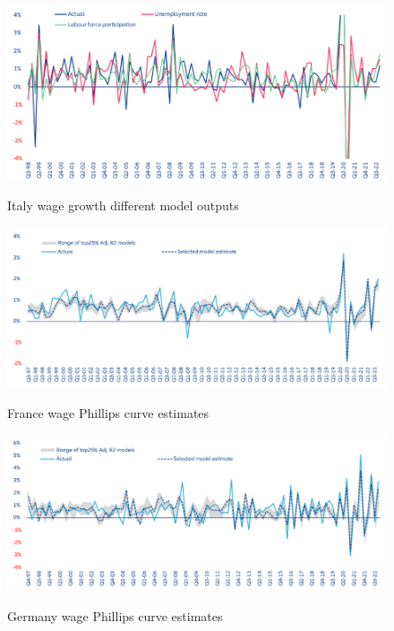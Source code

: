 \begin{figure}[H]
    \centering
    \caption{Italy wage growth different model outputs}
    \includegraphics[width=.95\textwidth]{Core/2.Labour/img/Italy output.png}
    \label{figure:it_output}
\end{figure}

\begin{figure}[H]
    \centering
    \caption{France wage Phillips curve estimates}
    \includegraphics[width=.95\textwidth]{Core/2.Labour/img/france25.png}
    \label{figure:fr25}
\end{figure}

\begin{figure}[H]
    \centering
    \caption{Germany wage Phillips curve estimates}
    \includegraphics[width=.95\textwidth]{Core/2.Labour/img/Germany25.png}
    \label{figure:ger25}
\end{figure}

